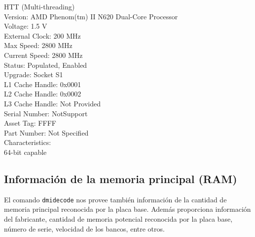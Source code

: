 \documentclass[12pt]{article}
\begin{document}
{{{{		HTT (Multi-threading)\\
	Version: AMD Phenom(tm) II N620 Dual-Core Processor\\
	Voltage: 1.5 V\\
	External Clock: 200 MHz\\
	Max Speed: 2800 MHz\\
	Current Speed: 2800 MHz\\
	Status: Populated, Enabled\\
	Upgrade: Socket S1\\
	L1 Cache Handle: 0x0001\\
	L2 Cache Handle: 0x0002\\
	L3 Cache Handle: Not Provided\\
	Serial Number: NotSupport\\
	Asset Tag: FFFF\\
	Part Number: Not Specified\\
	Characteristics:\\
		64-bit capable
}
} \vspace*{0.5cm} } } 

\subsection*{Información de la memoria principal (RAM)}

El comando \texttt{dmidecode} nos provee también información de la cantidad de memoria 
principal reconocida por la placa base. Además proporciona información del fabricante, 
cantidad de memoria potencial reconocida por la placa base, número de serie, velocidad de los
bancos, entre otros. 
\end{document}

